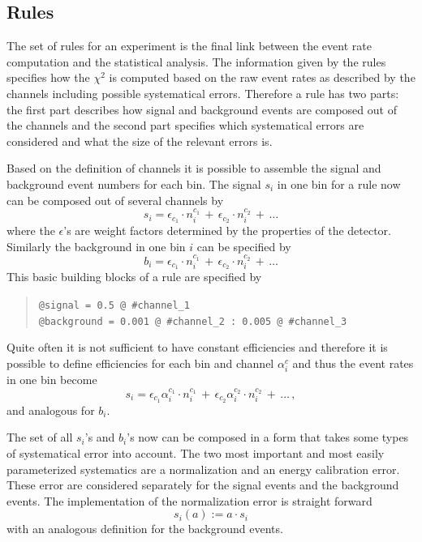 \subsection{Rules}
\label{sec:rules}

The set of rules for an experiment is the final 
link between the event rate
computation and the statistical analysis. The information given by the rules
specifies how the $\chi^2$ is computed based on the raw event rates as 
described by the channels including possible systematical errors. 
Therefore a rule has two parts: the first part describes how signal and 
background events are composed out of the channels and the second part
specifies which systematical errors are considered and what the size
of the relevant errors is.

Based on the definition of channels it is possible to assemble the 
signal and background event numbers for each bin.  
The signal $s_i$ in one bin for a rule now can be composed out of 
several channels by
\begin{equation}
s_i=\epsilon_{c_1}\cdot n_i^{c_1}\,+\,\epsilon_{c_2}\cdot n_i^{c_2}\,+\,\ldots
\end{equation}
where the $\epsilon$'s are weight factors determined by the properties
of the detector.
Similarly the background in one bin $i$ can be specified by
\begin{equation}
b_i=\epsilon_{c_1}\cdot n_i^{c_1}\,+\,\epsilon_{c_2}\cdot n_i^{c_2}\,+\,\ldots
\end{equation}
This basic building blocks of a rule are specified by
\begin{quote}
{\tt \tb @signal = 0.5 @ \#channel\_1\\
\tb @background = 0.001 @ \#channel\_2 :  0.005 @ \#channel\_3
}
\end{quote}

Quite often it is not sufficient to have constant efficiencies and therefore
it is possible to define efficiencies for each bin and channel $\alpha_i^c$
and thus the event rates in one bin become
\begin{equation}
s_i=\epsilon_{c_1}\alpha_i^{c_1}\cdot n_i^{c_1}\,+
\,\epsilon_{c_2}\alpha_i^{c_2}\cdot n_i^{c_2}\,+\,\ldots\,,
\end{equation}
and analogous for $b_i$.



The set of all $s_i$'s and $b_i$'s now can be composed in a form that takes
some types of systematical error into account. The two most important and
most easily parameterized systematics are a normalization and an energy
calibration error. These error are considered separately for the signal events
and the background events. The implementation of the normalization error
is straight forward
\begin{equation}
s_i(a):=a\cdot s_i
\end{equation} 
with an analogous definition for the background events.


